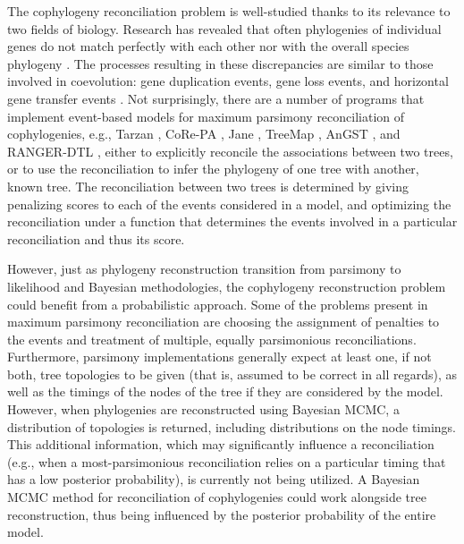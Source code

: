 \documentclass[12pt,letterpaper]{article}
\begin{document}
The cophylogeny reconciliation problem is well-studied thanks to its relevance to two fields of biology. Research has revealed that often phylogenies of individual genes do not match perfectly with each other nor with the overall species phylogeny \parencite{Degnan:2009}. The processes resulting in these discrepancies are similar to those involved in coevolution: gene duplication events, gene loss events, and horizontal gene transfer events \parencite{David:2011}. Not surprisingly, there are a number of programs that implement event-based models for maximum parsimony reconciliation of cophylogenies, e.g., Tarzan \parencite{Merkle:2005}, CoRe-PA \parencite{Merkle:2010}, Jane \parencite{Conow:2010}, TreeMap \parencite{Charleston:2011}, AnGST \parencite{David:2011}, and RANGER-DTL \parencite{Bansal:2012}, either to explicitly reconcile the associations between two trees, or to use the reconciliation to infer the phylogeny of one tree with another, known tree. The reconciliation between two trees is determined by giving penalizing scores to each of the events considered in a model, and optimizing the reconciliation under a function that determines the events involved in a particular reconciliation and thus its score.

However, just as phylogeny reconstruction transition from parsimony to likelihood and Bayesian methodologies, the cophylogeny reconstruction problem could benefit from a probabilistic approach. Some of the problems present in maximum parsimony reconciliation are choosing the assignment of penalties to the events \parencite{Merkle:2010} and treatment of multiple, equally parsimonious reconciliations. Furthermore, parsimony implementations generally expect at least one, if not both, tree topologies to be given (that is, assumed to be correct in all regards), as well as the timings of the nodes of the tree if they are considered by the model. However, when phylogenies are reconstructed using Bayesian \ac{MCMC}, a distribution of topologies is returned, including distributions on the node timings. This additional information, which may significantly influence a reconciliation (e.g., when a most-parsimonious reconciliation relies on a particular timing that has a low posterior probability), is currently not being utilized. A Bayesian \ac{MCMC} method for reconciliation of cophylogenies could work alongside tree reconstruction, thus being influenced by the posterior probability of the entire model.
\end{document}
